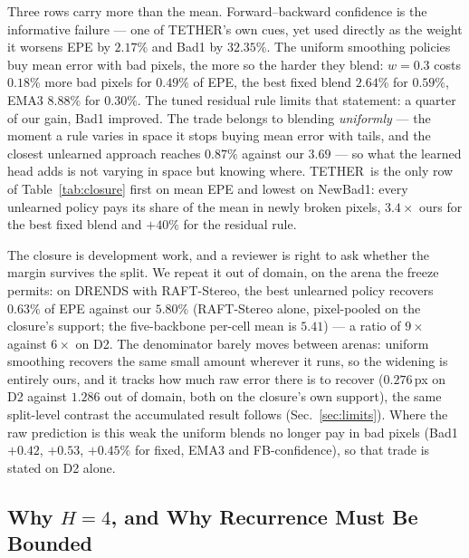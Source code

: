 \documentclass[letterpaper,10pt,conference]{ieeeconf}
\newcommand{\steer}{TETHER}
\begin{document}
Three rows carry more than the mean. Forward--backward confidence is the
informative failure --- one of \steer's own cues, yet used directly as the
weight it worsens EPE by $2.17\%$ and Bad1 by $32.35\%$. The uniform smoothing
policies buy mean error with bad pixels, the more so the harder they blend:
$w{=}0.3$ costs $0.18\%$ more bad pixels for $0.49\%$ of EPE, the best fixed
blend $2.64\%$ for $0.59\%$, EMA3 $8.88\%$ for $0.30\%$. The tuned residual rule limits that statement: a quarter of our gain, Bad1 improved. The trade belongs to blending \emph{uniformly} --- the moment a rule varies in space it stops buying mean error with tails, and the closest unlearned approach reaches $0.87\%$ against our $3.69$ --- so what the learned head adds is not varying in space but knowing where. \steer\ is the only row of
Table~\ref{tab:closure} first on mean EPE and lowest on NewBad1: every
unlearned policy pays its share of the mean in newly broken pixels, $3.4\times$
ours for the best fixed blend and $+40\%$ for the residual rule.

The closure is development work, and a reviewer is right to ask whether the
margin survives the split. We repeat it out of domain, on the arena the freeze
permits: on DRENDS with RAFT-Stereo, the best unlearned policy recovers
$0.63\%$ of EPE against our $5.80\%$ (RAFT-Stereo alone, pixel-pooled on the
closure's support; the five-backbone per-cell mean is $5.41$) --- a ratio of
$9\times$ against $6\times$ on D2. The denominator barely moves between arenas:
uniform smoothing recovers the same small amount wherever it runs, so the
widening is entirely ours, and it tracks how much raw error there is to
recover ($0.276$\,px on D2 against $1.286$ out of domain, both on the
closure's own support), the same split-level contrast the accumulated result
follows (Sec.~\ref{sec:limits}). Where the raw prediction is this weak the uniform blends no longer pay in
bad pixels (Bad1 $+0.42$, $+0.53$, $+0.45\%$ for fixed, EMA3 and
FB-confidence), so that trade is stated on D2 alone.

\subsection{Why $H=4$, and Why Recurrence Must Be Bounded}
\label{sec:horizon}
\end{document}
